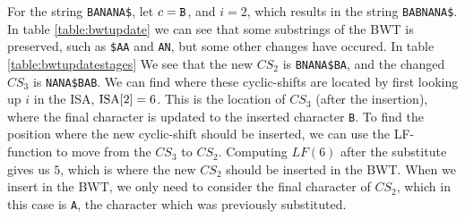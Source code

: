 \begin{table}[t]
	\begin{center}
        \hspace{1cm}
		\caption{BWT for string before and after insert}
		\label{table:bwtupdate}
	\end{center}
\end{table}

For the string \verb|BANANA$|, let $c = \verb|B|$, and $i = 2$, which results in the
string \verb|BABNANA$|. In table \ref{table:bwtupdate} we can see that some substrings of
the BWT is preserved, such as \verb|$AA| and \verb|AN|, but some other changes have
occured. In table \ref{table:bwtupdatestages} We see that the new $CS_2$ is
\verb|BNANA$BA|, and the changed $CS_3$ is \verb|NANA$BAB|. We can find where these
cyclic-shifts are located by first looking up $i$ in the ISA, $\mathrm{ISA}[{2}] = 6$. This is the
location of $CS_3$ (after the insertion), where the final character is updated to the
inserted character \verb|B|. To find the position where the new cyclic-shift should be
inserted, we can use the LF-function to move from the $CS_3$ to $CS_2$. Computing
$LF(6)$ after the substitute gives us $5$, which is where the new $CS_2$ should be
inserted in the BWT. When we insert in the BWT, we only need to consider the final
character of $CS_2$, which in this case is \verb|A|, the character which was previously
substituted.

